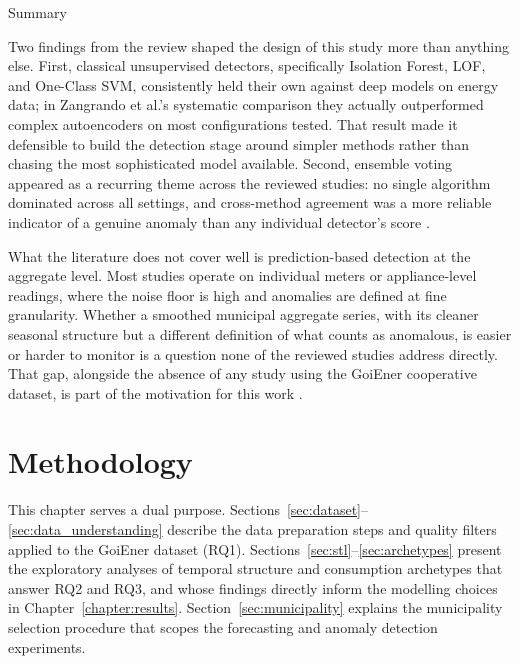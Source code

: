 ﻿\documentclass[12pt,reqno, twoside]{amsbook}
\makeatletter
\numberwithin{figure}{chapter}
\numberwithin{table}{chapter}
\numberwithin{equation}{chapter}
\def\subsection{\@startsection{subsection}{2}%
      \z@{.5\linespacing\@plus.7\linespacing}{.25\linespacing}%
      {\normalfont\bfseries\flushleft}}
\theoremstyle{plain}
\numberwithin{equation}{chapter}
\numberwithin{section}{chapter}
\makeatother
\begin{document}
\subsection{Summary}
\label{subsection:summary}

\noindent Two findings from the review shaped the design of this study more than anything else. First, classical unsupervised detectors, specifically Isolation Forest, \ac{LOF}, and One-Class \ac{SVM}, consistently held their own against deep models on energy data; in Zangrando et al.'s \cite{zangrando_anomaly_2022} systematic comparison they actually outperformed complex autoencoders on most configurations tested. That result made it defensible to build the detection stage around simpler methods rather than chasing the most sophisticated model available. Second, ensemble voting appeared as a recurring theme across the reviewed studies: no single algorithm dominated across all settings, and cross-method agreement was a more reliable indicator of a genuine anomaly than any individual detector's score \cite{m_z_h_unsupervised_2021, zangrando_anomaly_2022}.

What the literature does not cover well is prediction-based detection at the aggregate level. Most studies operate on individual meters or appliance-level readings, where the noise floor is high and anomalies are defined at fine granularity. Whether a smoothed municipal aggregate series, with its cleaner seasonal structure but a different definition of what counts as anomalous, is easier or harder to monitor is a question none of the reviewed studies address directly. That gap, alongside the absence of any study using the GoiEner cooperative dataset, is part of the motivation for this work \cite{himeur_artificial_2021, gaur_performance_2019}.




\chapter{Methodology}
\label{chapter:Methodology}

\noindent This chapter serves a dual purpose. Sections~\ref{sec:dataset}--\ref{sec:data_understanding} describe the data preparation steps and quality filters applied to the GoiEner dataset (RQ1). Sections~\ref{sec:stl}--\ref{sec:archetypes} present the exploratory analyses of temporal structure and consumption archetypes that answer RQ2 and RQ3, and whose findings directly inform the modelling choices in Chapter~\ref{chapter:results}. Section~\ref{sec:municipality} explains the municipality selection procedure that scopes the forecasting and anomaly detection experiments.
\end{document}
